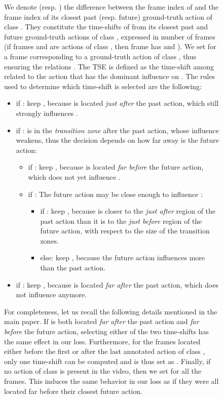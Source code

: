 \documentclass[10pt,twocolumn,letterpaper]{article}
\begin{document}
\begin{figure}[t]
{\begin{minipage}{\linewidth}
We denote  (resp. ) the difference between the frame index of  and the frame index of its closest past (resp. future) ground-truth action of class . They constitute the time-shifts of  from its closest past and future ground-truth actions of class , expressed in number of frames (\ie if frames  and  are actions of class , then frame  has  and ). We set  for a frame corresponding to a ground-truth action of class , thus ensuring the relations . 
The TSE  is defined as the time-shift among  related to the action that has the dominant influence on . The rules used to determine which time-shift is selected are the following:
\begin{itemize}
    \item if : keep , because  is located \emph{just after} the past action, which still strongly influences . \item if :  is in the \emph{transition zone} after the past action, whose influence weakens, thus the decision depends on how far away is the future action:
    \begin{itemize}
        \item if : keep , because  is located \emph{far before} the future action, which does not yet influence .
        \item if :
        The future action may be close enough to influence :
        \begin{itemize}
            \item if : keep , because  is closer to the \emph{just after} region of the past action than it is to the \emph{just before} region of the future action, with respect to the size of the transition zones. \item else: keep , because the future action influences  more than the past action.
        \end{itemize}
    \end{itemize}
    \item if : keep , because  is located \emph{far after} the past action, which does not influence  anymore.
\end{itemize}
For completeness, let us recall the following details mentioned in the main paper.
If  is both located \emph{far after} the past action and \emph{far before} the future action, selecting either of the two time-shifts has the same effect in our loss. Furthermore, for the frames located either before the first or after the last annotated action of class , only one time-shift can be computed and is thus set as . Finally, if no action of class  is present in the video, then we set  for all the frames. This induces the same behavior in our loss as if they were all located far before their closest future action.



\end{minipage}}
\end{figure}
\end{document}
